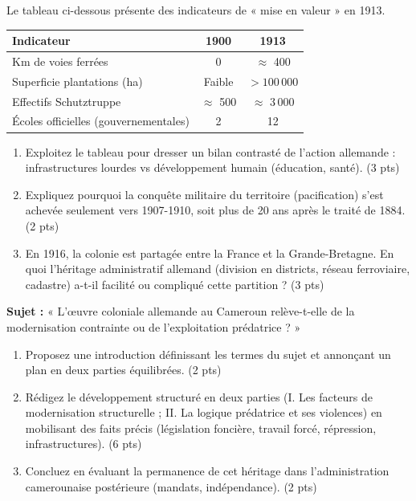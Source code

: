 \documentclass[11pt]{article}
\begin{document}
\begin{exercice}
Le tableau ci-dessous présente des indicateurs de « mise en valeur » en 1913.

\begin{center}
\begin{tabular}{|l|c|c|}
\hline
\textbf{Indicateur} & \textbf{1900} & \textbf{1913} \\
\hline
Km de voies ferrées & 0 & $\approx$ 400 \\
\hline
Superficie plantations (ha) & Faible & $> 100\,000$ \\
\hline
Effectifs Schutztruppe & $\approx$ 500 & $\approx$ 3\,000 \\
\hline
Écoles officielles (gouvernementales) & 2 & 12 \\
\hline
\end{tabular}
\end{center}

\begin{enumerate}
    \item Exploitez le tableau pour dresser un bilan contrasté de l'action allemande : infrastructures lourdes vs développement humain (éducation, santé). (3 pts)
    \item Expliquez pourquoi la conquête militaire du territoire (pacification) s'est achevée seulement vers 1907-1910, soit plus de 20 ans après le traité de 1884. (2 pts)
    \item En 1916, la colonie est partagée entre la France et la Grande-Bretagne. En quoi l'héritage administratif allemand (division en districts, réseau ferroviaire, cadastre) a-t-il facilité ou compliqué cette partition ? (3 pts)
\end{enumerate}
\end{exercice}

\begin{exercice}
\textbf{Sujet :} « L'œuvre coloniale allemande au Cameroun relève-t-elle de la modernisation contrainte ou de l'exploitation prédatrice ? »

\begin{enumerate}
    \item Proposez une introduction définissant les termes du sujet et annonçant un plan en deux parties équilibrées. (2 pts)
    \item Rédigez le développement structuré en deux parties (I. Les facteurs de modernisation structurelle ; II. La logique prédatrice et ses violences) en mobilisant des faits précis (législation foncière, travail forcé, répression, infrastructures). (6 pts)
    \item Concluez en évaluant la permanence de cet héritage dans l'administration camerounaise postérieure (mandats, indépendance). (2 pts)
\end{enumerate}
\end{exercice}
\end{document}
